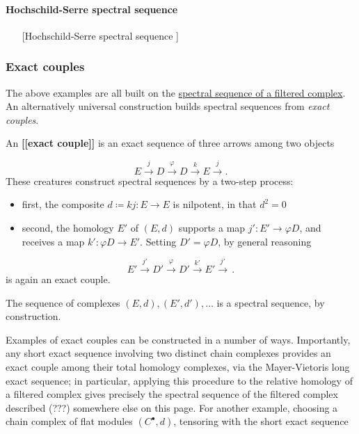 \documentclass[12pt,titlepage]{article}
\theoremstyle{plain}
\theoremstyle{definition}
\theoremstyle{remark}
\begin{document}
\hypertarget{HochschildSerreSpectralSequence}{}\paragraph*{{Hochschild-Serre spectral sequence}}\label{HochschildSerreSpectralSequence}

\begin{itemize}%
\item [[Hochschild-Serre spectral sequence]]

\end{itemize}
\hypertarget{exact_couples}{}\subsubsection*{{Exact couples}}\label{exact_couples}

The above examples are all built on the \hyperlink{SpectralSequenceOfFilteredComplex}{spectral sequence of a filtered complex}. An alternatively universal construction builds spectral sequences from \emph{exact couples}.

An \textbf{[[exact couple]]} is an exact sequence of three arrows among two objects

\begin{displaymath}
E \overset{j}{\to} D \overset{\varphi}{\to} D \overset{k}{\to} E \overset{j}{\to}.
\end{displaymath}
These creatures construct spectral sequences by a two-step process:

\begin{itemize}%
\item first, the composite $d \coloneqq k j \colon E\to E$ is nilpotent, in that $d^2=0$
\item second, the homology $E'$ of $(E,d)$ supports a map $j':E'\to \varphi D$, and receives a map $k':\varphi D\to E'$. Setting $D'=\varphi D$, by general reasoning

\end{itemize}
\begin{displaymath}
E' \overset{j'}{\to} D' \overset{\varphi}{\to} D' \overset{k'}{\to} E' \overset{j'}{\to}
  \,.
\end{displaymath}
is again an exact couple.

The sequence of complexes $(E,d),(E',d'),\dots$ is a spectral sequence, by construction.

Examples of exact couples can be constructed in a number of ways. Importantly, any short exact sequence involving two distinct chain complexes provides an exact couple among their total homology complexes, via the Mayer-Vietoris long exact sequence; in particular, applying this procedure to the relative homology of a filtered complex gives precisely the spectral sequence of the filtered complex described (???) somewhere else on this page. For another example, choosing a chain complex of flat modules $(C^\bullet,d)$, tensoring with the short exact sequence
\end{document}
